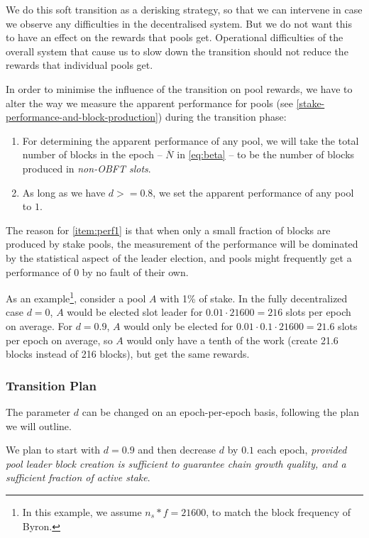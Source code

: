 \documentclass[11pt,a4paper]{article}
\newcommand\Nbar{\overline{N}}
\begin{document}
We do this soft transition as a derisking strategy, so that we can intervene in
case we observe any difficulties in the decentralised system. But we do not want
this to have an effect on the rewards that pools get. Operational difficulties
of the overall system that cause us to slow down the transition should not
reduce the rewards that individual pools get.

In order to minimise the influence of the transition on pool rewards, we have to
alter the way we measure the apparent performance for pools (see
\cref{stake-performance-and-block-production}) during the transition phase:
\begin{enumerate}
  \item
    For determining the apparent performance of any pool, we will take the total
    number of blocks in the epoch -- \(\Nbar\) in \cref{eq:beta} -- to be the
    number of blocks produced in \emph{non-OBFT slots}.
  \item
    As long as we have \(d >= 0.8\), we set the apparent performance of any pool
    to \(1\).
    \label{item:perf1}
\end{enumerate}
The reason for \cref{item:perf1} is that when only a small fraction of blocks
are produced by stake pools, the measurement of the performance will be
dominated by the statistical aspect of the leader election, and pools might
frequently get a performance of \(0\) by no fault of their own.

As an example\footnote{In this example, we assume \(n_s*f=21600\), to match the
  block frequency of Byron.}, consider a pool \(A\) with 1\% of stake. In the
fully decentralized case \(d=0\), \(A\) would be elected slot leader for
\(0.01\cdot 21600=216\) slots per epoch on average. For \(d=0.9\), \(A\) would
only be elected for \(0.01\cdot 0.1\cdot 21600=21.6\) slots per epoch on
average, so \(A\) would only have a tenth of the work (create 21.6 blocks
instead of 216 blocks), but get the same rewards.

\subsubsection{Transition Plan}
\label{transition-plan}

The parameter \(d\) can be changed on an epoch-per-epoch basis, following
the plan we will outline.

We plan to start with \(d=0.9\) and then decrease \(d\) by \(0.1\) each
epoch, \emph{provided pool leader block creation is sufficient to
guarantee chain growth quality, and a sufficient fraction of active
stake}.
\end{document}
